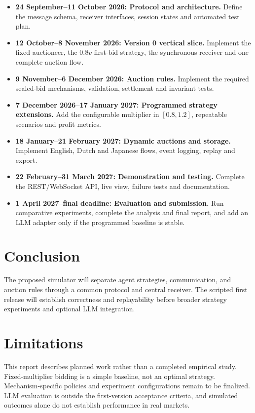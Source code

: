 \documentclass[11pt]{article}
\begin{document}
\begin{itemize}
  \item \textbf{24 September--11 October 2026: Protocol and architecture.} Define the message schema, receiver interfaces, session states and automated test plan.
  \item \textbf{12 October--8 November 2026: Version 0 vertical slice.} Implement the fixed auctioneer, the $0.8v$ first-bid strategy, the synchronous receiver and one complete auction flow.
  \item \textbf{9 November--6 December 2026: Auction rules.} Implement the required sealed-bid mechanisms, validation, settlement and invariant tests.
  \item \textbf{7 December 2026--17 January 2027: Programmed strategy extensions.} Add the configurable multiplier in $[0.8,1.2]$, repeatable scenarios and profit metrics.
  \item \textbf{18 January--21 February 2027: Dynamic auctions and storage.} Implement English, Dutch and Japanese flows, event logging, replay and export.
  \item \textbf{22 February--31 March 2027: Demonstration and testing.} Complete the REST/WebSocket API, live view, failure tests and documentation.
  \item \textbf{1 April 2027--final deadline: Evaluation and submission.} Run comparative experiments, complete the analysis and final report, and add an LLM adapter only if the programmed baseline is stable.
\end{itemize}

\section{Conclusion}
The proposed simulator will separate agent strategies, communication, and auction rules through a common protocol and central receiver. The scripted first release will establish correctness and replayability before broader strategy experiments and optional LLM integration.

\section*{Limitations}
This report describes planned work rather than a completed empirical study. Fixed-multiplier bidding is a simple baseline, not an optimal strategy. Mechanism-specific policies and experiment configurations remain to be finalized. LLM evaluation is outside the first-version acceptance criteria, and simulated outcomes alone do not establish performance in real markets.


\end{document}
